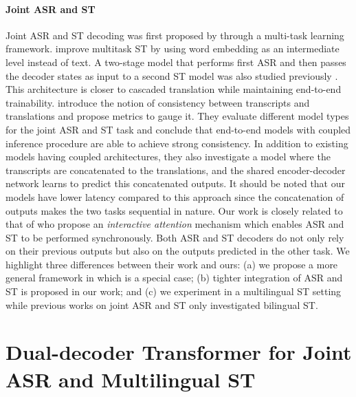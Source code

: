 \documentclass[11pt]{article}
\theoremstyle{plain}
\theoremstyle{definition}
\begin{document}
\paragraph{Joint ASR and ST} 
Joint ASR and ST decoding was first proposed by  through a multi-task learning framework.  improve multitask ST by using word embedding as an intermediate level instead of text. A two-stage model that performs first ASR and then passes the decoder states as input to a second ST model was also studied previously \cite{anastasopoulos2018tied,sperber2019attention}. This architecture is closer to cascaded translation while maintaining end-to-end trainability.  introduce the notion of consistency between transcripts and translations and propose metrics to gauge it. They evaluate different model types for the joint ASR and ST task and conclude that end-to-end models with coupled inference procedure are able to achieve strong consistency. In addition to existing models having coupled architectures, they also investigate a model where the transcripts are concatenated to the translations, and the shared encoder-decoder network learns to predict this concatenated outputs. It should be noted that our models have lower latency compared to this approach since the concatenation of outputs makes the two tasks sequential in nature. Our work is closely related to that of  who propose an \textit{interactive attention} mechanism which enables ASR and ST to be performed synchronously. Both ASR and ST decoders do not only rely on their previous outputs but also on the outputs predicted in the other task. We highlight three differences between their work and ours: (a) we propose a more general framework in which \cite{liu2019synchronous} is a special case; (b) tighter integration of ASR and ST is proposed in our work; and (c) we experiment in a multilingual ST setting while previous works on joint ASR and ST only investigated bilingual ST.












\section{Dual-decoder Transformer for Joint ASR and Multilingual ST}
\end{document}
